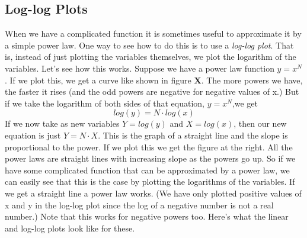\subsection*{Log-log Plots}
When we have a complicated function it is sometimes useful to approximate it by a simple power law.
One way to see how to do this is to use a \emph{log-log plot}.
That is, instead of just plotting the variables themselves, we plot the logarithm of the variables.
Let's see how this works.
Suppose we have a power law function $y = x^{N}$.
If we plot this, we get a curve like shown in figure \textbf{X}.
The more powers we have, the faster it rises (and the odd powers are negative for negative values of x.)
But if we take the logarithm of both sides of that equation, $y = x^{N}$,we get
\[ log(y)=N \cdot log(x) \] 
If we now take as new variables $Y = log(y)$ and $X = log(x)$, then our new equation is just $Y = N \cdot X$.
This is the graph of a straight line and the slope is proportional to the power.
If we plot this we get the figure at the right.
All the power laws are straight lines with increasing slope as the powers go up.
So if we have some complicated function that can be approximated by a power law, we can easily see that this is the case by plotting the logarithms of the variables. 
If we get a straight line a power law works. 
(We have only plotted positive values of x and y in the log-log plot since the log of a negative number is not a real number.)
Note that this works for negative powers too. 
Here's what the linear and log-log plots look like for these.
